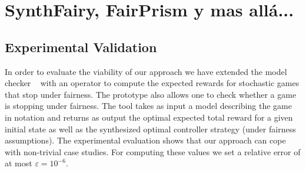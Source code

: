 \chapter{SynthFairy, FairPrism y mas allá...}
\label{cap:fairPrism}

\section{Experimental Validation} \label{sec:experimental_eval}


In order to evaluate the viability of our approach we have  extended the model checker {\Prism}~\cite{DBLP:conf/cav/KwiatkowskaN0S20,DBLP:conf/cav/KwiatkowskaNP11} with an operator to compute the expected rewards for stochastic games that stop under fairness. The prototype also allows one to check whether a game is stopping under fairness.
The tool takes as input a model describing the game in {\Prism} notation and returns as output 
the optimal expected total reward  for a given  initial state as well as the synthesized optimal controller strategy (under fairness assumptions). 
The experimental  evaluation shows that our approach can cope with non-trivial  case studies. For computing these values we set a relative error of at most $\varepsilon = 10^{-6}$.



